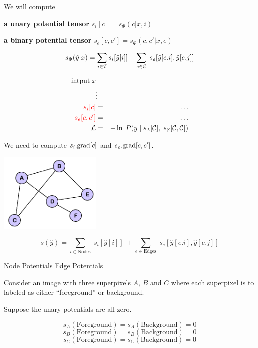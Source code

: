 {\vfill
We will compute

\vfill {\bf a unary potential tensor} $s_i[c] = s_\Phi(c|x,i)$

\vfill
{\bf a binary potential tensor} $s_e[c,c'] = s_\Phi(c,c'|x,e)$

\vfill
{\color{red} $$s_\Phi(\hat{y}|x) = \sum_{i \in {\cal I}} s_i[\hat{y}[i]] + \sum_{e \in {\cal E}}\;s_e[\hat{y}[e.i],\hat{y}[e.j]]$$}


\vfill
\begin{eqnarray*}
\mbox{intput}\; x \\
 & \vdots & \\
{\color{red} s_i[c]} & = & \ldots \\
{\color{red} s_e[c,c']} & = & \ldots \\
{\cal L} & = & - \ln\; P(y\;|\;s_{\cal I}[{\cal C}],\;s_{\cal E}[{\cal C}, {\cal C}])
\end{eqnarray*}

\vfill
We need to compute {\color{red} $s_i.\mathrm{grad}[c]$} and {\color{red} $s_e.\mathrm{grad}[c,c']$}.


\centerline{\includegraphics[height= 1.5in]{../images/Graph}}

$$s(\hat{y}) = \sum_{i \in \mathrm{Nodes}}\; s_i[\hat{y}[i]]\; + \sum_{e \in \mathrm{Edges}}\;s_e[\hat{y}[e.i],\hat{y}[e.j]]$$

\vfill
\centerline{Node Potentials \hspace{4em}Edge Potentials}


Consider an image with three superpixels $A$, $B$ and $C$ where
each superpixel is to labeled as either ``foreground'' or background.

\vfill
Suppose the unary potentials are all zero.

\vfill
$$s_A(\mathrm{Foreground}) = s_A(\mathrm{Background}) = 0$$
$$s_B(\mathrm{Foreground}) = s_B(\mathrm{Background}) = 0$$
$$s_C(\mathrm{Foreground}) = s_C(\mathrm{Background}) = 0$$

}
